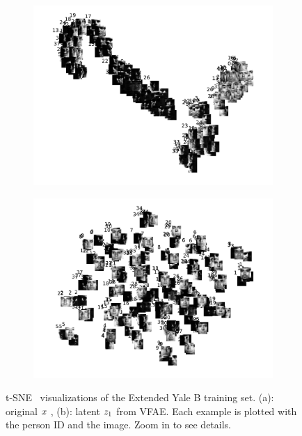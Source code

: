 \begin{figure}[ht]
    \centering
    \begin{subfigure}{.49\textwidth}
    \centering
        \includegraphics[width=\textwidth]{yaleb_x.pdf}
        \caption{}
        \label{fig:yaleb_x}
  \end{subfigure} %
    \begin{subfigure}{.49\textwidth}
      \centering
        \includegraphics[width=\textwidth]{yaleb_z.pdf}
        \caption{}
        \label{fig:yaleb_z}
     \end{subfigure} %
    \caption{t-SNE~\citep{2013arXiv1301.3342V} visualizations of the Extended Yale B training set. (a): original $\*x$ , (b):  latent $\*z_1$  from VFAE. Each example is plotted with the person ID and the image. Zoom in to see details.}
    \label{fig:yaleb_via}
\end{figure}
